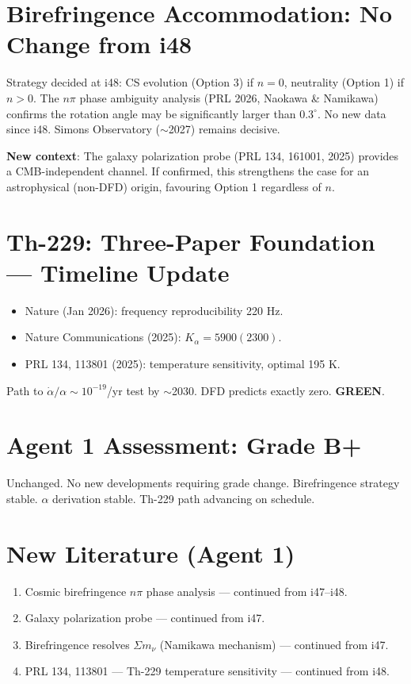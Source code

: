 \documentclass[11pt,a4paper]{article}
\newcommand{\GREEN}{\textcolor{dfdgreen}{\textbf{GREEN}}}
\begin{document}
\section{Birefringence Accommodation: No Change from i48}

Strategy decided at i48: CS evolution (Option 3) if $n = 0$, neutrality (Option 1) if $n > 0$. The $n\pi$ phase ambiguity analysis (PRL 2026, Naokawa \& Namikawa) confirms the rotation angle may be significantly larger than $0.3^\circ$. No new data since i48. Simons Observatory ($\sim$2027) remains decisive.

\textbf{New context}: The galaxy polarization probe (PRL 134, 161001, 2025) provides a CMB-independent channel. If confirmed, this strengthens the case for an astrophysical (non-DFD) origin, favouring Option 1 regardless of $n$.

\section{Th-229: Three-Paper Foundation --- Timeline Update}

\begin{itemize}
\item Nature (Jan 2026): frequency reproducibility 220 Hz.
\item Nature Communications (2025): $K_\alpha = 5900(2300)$.
\item PRL 134, 113801 (2025): temperature sensitivity, optimal 195 K.
\end{itemize}

Path to $\dot{\alpha}/\alpha \sim 10^{-19}$/yr test by $\sim$2030. DFD predicts exactly zero. \GREEN.

\section{Agent 1 Assessment: Grade B+}

Unchanged. No new developments requiring grade change. Birefringence strategy stable. $\alpha$ derivation stable. Th-229 path advancing on schedule.

\section{New Literature (Agent 1)}

\begin{enumerate}
\item Cosmic birefringence $n\pi$ phase analysis --- continued from i47--i48.
\item Galaxy polarization probe --- continued from i47.
\item Birefringence resolves $\Sigma m_\nu$ (Namikawa mechanism) --- continued from i47.
\item PRL 134, 113801 --- Th-229 temperature sensitivity --- continued from i48.
\end{enumerate}
\end{document}

